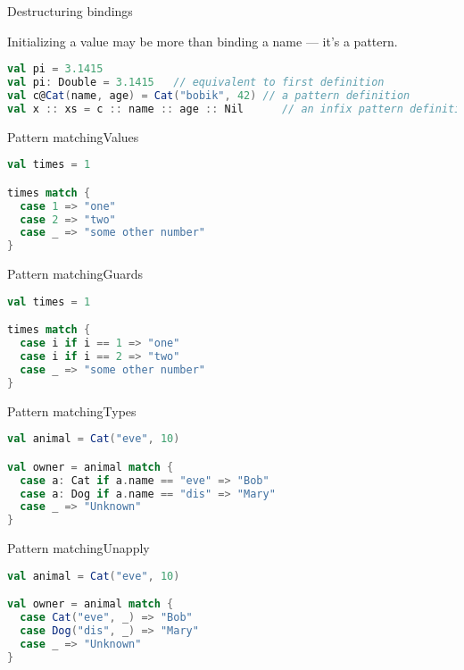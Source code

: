 \documentclass[aspectratio=169]{beamer}
\begin{document}

\begin{frame}[fragile]{Destructuring bindings}
  \begin{block}{}
    Initializing a value may be more than binding a name --- it's a pattern.
  \end{block}
  \vspace{2em}
  \pause
\begin{lstlisting}[style=scala,language=scala]
val pi = 3.1415
val pi: Double = 3.1415   // equivalent to first definition
val c@Cat(name, age) = Cat("bobik", 42) // a pattern definition
val x :: xs = c :: name :: age :: Nil      // an infix pattern definition
\end{lstlisting}
\end{frame}

\begin{frame}[fragile]{Pattern matching}{Values}
\begin{lstlisting}[style=scala,language=scala]
val times = 1

times match {
  case 1 => "one"
  case 2 => "two"
  case _ => "some other number"
}
\end{lstlisting}
\end{frame}

\begin{frame}[fragile]{Pattern matching}{Guards}
\begin{lstlisting}[style=scala,language=scala]
val times = 1

times match {
  case i if i == 1 => "one"
  case i if i == 2 => "two"
  case _ => "some other number"
}
\end{lstlisting}
\end{frame}

\begin{frame}[fragile]{Pattern matching}{Types}
\begin{lstlisting}[style=scala,language=scala]
val animal = Cat("eve", 10)

val owner = animal match {
  case a: Cat if a.name == "eve" => "Bob"
  case a: Dog if a.name == "dis" => "Mary"
  case _ => "Unknown"
}
\end{lstlisting}
\end{frame}

\begin{frame}[fragile]{Pattern matching}{Unapply}
\begin{lstlisting}[style=scala,language=scala]
val animal = Cat("eve", 10)

val owner = animal match {
  case Cat("eve", _) => "Bob"
  case Dog("dis", _) => "Mary"
  case _ => "Unknown"
}
\end{lstlisting}
\end{frame}
\end{document}
